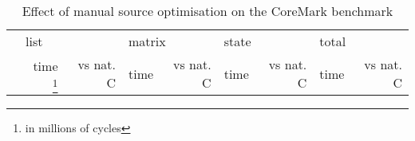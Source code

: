 
\begin{table}
\caption{Effect of manual source optimisation on the CoreMark benchmark}
\label{tbl-coremark-manual-optimisation}
    \begin{tabular}{lrrrrrrrr}
    \toprule
                                                                         & \multicolumn{2}{l}{list}     & \multicolumn{2}{l}{matrix}     &  \multicolumn{2}{l}{state}       & \multicolumn{2}{l}{total}     \\
                                                                         & \tiny time \footnote{in millions of cycles} & \tiny vs nat. C & \tiny time  & \tiny vs nat. C& \tiny time  & \tiny vs nat. C& \tiny time  & \tiny vs nat. C \\


\end{tabular}
\end{table}
